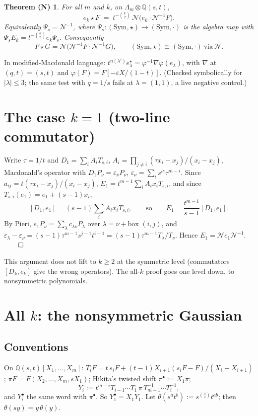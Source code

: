\documentclass[11pt]{article}
\newtheorem*{theoremN}{Theorem (N)}
\theoremstyle{definition}
\newcommand{\Q}{\mathbb{Q}}
\newcommand{\cN}{\mathcal{N}}
\newcommand{\bul}{\bullet}
\begin{document}
\begin{theoremN}
For all $m$ and $k$, on $\Lambda_m\otimes\Q(s,t)$,
\[
e_k\star F \;=\; t^{-\binom{k}{2}}\,\cN\bigl(e_k\cdot\cN^{-1}F\bigr).
\]
Equivalently $\Psi_s=\cN^{-1}$, where $\Psi_s:(\mathrm{Sym},\star)\to(\mathrm{Sym},\cdot)$ is the algebra map with $\Psi_sE_k=t^{-\binom k2}e_k\Psi_s$. Consequently
\[
F\star G=\cN\bigl(\cN^{-1}F\cdot\cN^{-1}G\bigr),\qquad (\mathrm{Sym},\star)\cong(\mathrm{Sym},\cdot)\ \text{via}\ \cN.
\]
\end{theoremN}

In modified-Macdonald language: $t^{n(\lambda')}e^\star_\lambda=\varphi^{-1}\nabla\varphi(e_\lambda)$, with $\nabla$ at $(q,t)=(s,t)$ and $\varphi(F)=F[-\varepsilon X/(1-t)]$. (Checked symbolically for $|\lambda|\le3$; the same test with $q=1/s$ fails at $\lambda=(1,1)$, a live negative control.)

\section{\texorpdfstring{The case $k=1$}{The case k=1} (two-line commutator)}

Write $\tau=1/t$ and $D_1=\sum_iA_iT_{s,i}$, $A_i=\prod_{j\ne i}(\tau x_i-x_j)/(x_i-x_j)$, Macdonald's operator with $D_1P_\nu=\varepsilon_\nu P_\nu$, $\varepsilon_\nu=\sum_is^{\nu_i}\tau^{m-i}$. Since $a_{ij}=t(\tau x_i-x_j)/(x_i-x_j)$, $E_1=t^{m-1}\sum_iA_ix_iT_{s,i}$, and since $T_{s,i}(e_1)=e_1+(s-1)x_i$,
\[
[D_1,e_1]=(s-1)\sum_iA_ix_iT_{s,i},\qquad\text{so}\qquad E_1=\frac{t^{m-1}}{s-1}[D_1,e_1].
\]
By Pieri, $e_1P_\nu=\sum_\lambda c_{\lambda\nu}P_\lambda$ over $\lambda=\nu+\text{box }(i,j)$, and $\varepsilon_\lambda-\varepsilon_\nu=(s-1)\tau^{m-1}s^{j-1}t^{i-1}=(s-1)\tau^{m-1}T_\lambda/T_\nu$. Hence $E_1=\cN e_1\cN^{-1}$. $\qed$

This argument does not lift to $k\ge2$ at the symmetric level (commutators $[D_k,e_k]$ give the wrong operators). The all-$k$ proof goes one level down, to nonsymmetric polynomials.

\section{\texorpdfstring{All $k$}{All k}: the nonsymmetric Gaussian}

\subsection{Conventions}
On $\Q(s,t)[X_1,\dots,X_m]$: $T_iF=t\,s_iF+(t-1)X_{i+1}(s_iF-F)/(X_i-X_{i+1})$; $\pi F=F(X_2,\dots,X_m,sX_1)$; Hikita's twisted shift $\pi^\bul:=X_1\pi$;
\[
Y_i:=t^{m-i}T_{i-1}\cdots T_1\,\pi\,T_{m-1}^{-1}\cdots T_i^{-1},
\]
and $Y_i^\bul$ the same word with $\pi^\bul$. So $Y^\bul_1=X_1Y_1$. Let $\theta(s^at^b):=s^{\binom a2}t^{ab}$; then $\theta(sy)=y\,\theta(y)$.
\end{document}
